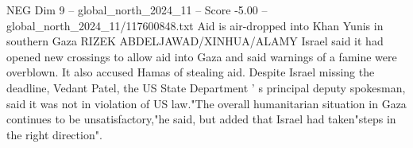 \begin{textsample}{NEG Dim 9 – global\_north\_2024\_11 – Score -5.00 – global\_north\_2024\_11/117600848.txt}
Aid is air-dropped into Khan Yunis in southern Gaza RIZEK ABDELJAWAD/XINHUA/ALAMY Israel said it had opened new crossings to allow aid into Gaza and said warnings of a famine were overblown.
It also accused Hamas of stealing aid.
Despite Israel missing the deadline, Vedant Patel, the US State Department ' s principal deputy spokesman, said it was not in violation of US law."The overall humanitarian situation in Gaza continues to be unsatisfactory,"he said, but added that Israel had taken"steps in the right direction".

\end{textsample}
